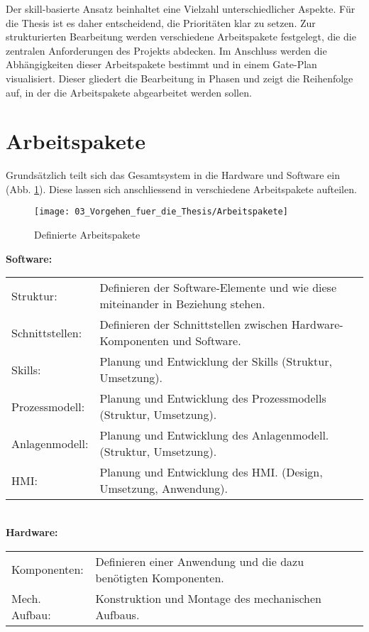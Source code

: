 Der skill-basierte Ansatz beinhaltet eine Vielzahl unterschiedlicher Aspekte. Für die Thesis ist es daher entscheidend, die Prioritäten klar zu setzen. Zur strukturierten Bearbeitung werden verschiedene Arbeitspakete festgelegt, die die zentralen Anforderungen des Projekts abdecken. Im Anschluss werden die Abhängigkeiten dieser Arbeitspakete bestimmt und in einem Gate-Plan visualisiert. Dieser gliedert die Bearbeitung in Phasen und zeigt die Reihenfolge auf, in der die Arbeitspakete abgearbeitet werden sollen.


\section{Arbeitspakete} \label{Arbeitspakete}

	Grundsätzlich teilt sich das Gesamtsystem in die Hardware und Software ein (Abb. \ref{fig:Arbeitspakete}). Diese lassen sich anschliessend in verschiedene Arbeitspakete aufteilen. 
	\\
	\begin{figure}[h!]
		\centering
		\texttt{[image: 03\_Vorgehen\_fuer\_die\_Thesis/Arbeitspakete]}
		\captionsetup{justification=centering}
		\caption{Definierte Arbeitspakete}
		\label{fig:Arbeitspakete}
	\end{figure}
	
	\textbf{Software:} \vspace{2mm} 
	\\
	\begin{tabularx}{\textwidth}{@{}>{}p{7em} X@{}}
		Struktur: & 
		Definieren der Software-Elemente und wie diese miteinander in Beziehung stehen. 
		\\
		
		Schnittstellen: & 
		Definieren der Schnittstellen zwischen Hardware-Komponenten und Software. 
		\\
		
		Skills: & 
		Planung und Entwicklung der Skills (Struktur, Umsetzung).
		\\
		
		Prozessmodell: & 
		Planung und Entwicklung des Prozessmodells (Struktur, Umsetzung).
		\\
		
		Anlagenmodell: & 
		Planung und Entwicklung des Anlagenmodell. (Struktur, Umsetzung).
		\\
		
		\Gls{HMI}: & 
		Planung und Entwicklung des \Gls{HMI}. (Design, Umsetzung, Anwendung).
		\\
	\end{tabularx}
	\vspace{3mm}
	\\
	\textbf{Hardware:} \vspace{2mm} 
	\\
	\begin{tabularx}{\textwidth}{@{}>{}p{7em} X@{}}
		Komponenten: & 
		Definieren einer Anwendung und die dazu benötigten Komponenten.
		\\
		
		Mech. Aufbau: & 
		Konstruktion und Montage des mechanischen Aufbaus.
		\\
	\end{tabularx}
	
	\newpage

